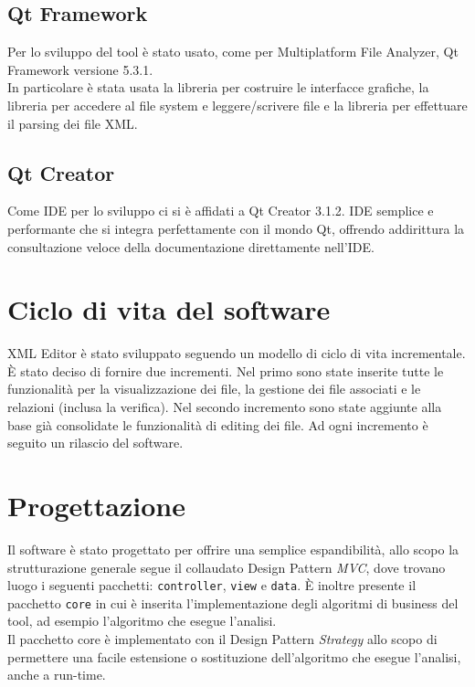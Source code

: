 	\subsection{Qt Framework}
		Per lo sviluppo del tool è stato usato, come per Multiplatform File Analyzer, Qt Framework versione 5.3.1.\\
		In particolare è stata usata la libreria per costruire le interfacce grafiche, la libreria per accedere al file system e leggere/scrivere file e la libreria per effettuare il parsing dei file XML.
	
	\subsection{Qt Creator}
		Come IDE per lo sviluppo ci si è affidati a Qt Creator 3.1.2. IDE semplice e performante che si integra perfettamente con il mondo Qt, offrendo addirittura la consultazione veloce della documentazione direttamente nell'IDE.
	
	\section{Ciclo di vita del software}
		XML Editor è stato sviluppato seguendo un modello di ciclo di vita incrementale. È stato deciso di fornire due incrementi. Nel primo sono state inserite tutte le funzionalità per la visualizzazione dei file, la gestione dei file associati e le relazioni (inclusa la verifica). Nel secondo incremento sono state aggiunte alla base già consolidate le funzionalità di editing dei file. Ad ogni incremento è seguito un rilascio del software.

\section{Progettazione}
	Il software è stato progettato per offrire una semplice espandibilità, allo scopo la strutturazione generale segue il collaudato Design Pattern \textit{MVC}, dove trovano luogo i seguenti pacchetti: \texttt{controller}, \texttt{view} e \texttt{data}. È inoltre presente il pacchetto \texttt{core} in cui è inserita l'implementazione degli algoritmi di business del tool, ad esempio l'algoritmo che esegue l'analisi.\\
	
	Il pacchetto core è implementato con il Design Pattern \textit{Strategy} allo scopo di permettere una facile estensione o sostituzione dell'algoritmo che esegue l'analisi, anche a run-time.\\
	
